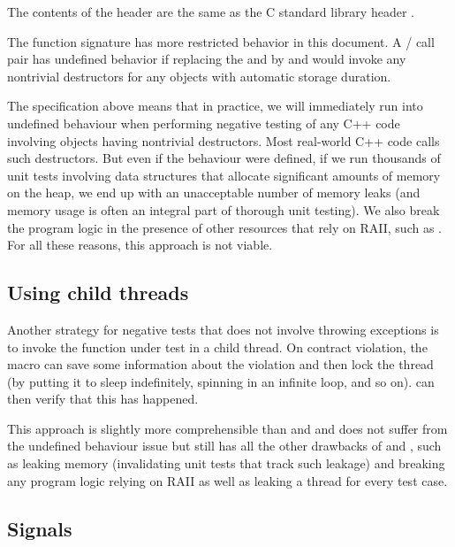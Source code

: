 \begin{adjustwidth}{0.5cm}{0.5cm}
The contents of the header  are the same as the C standard library header .

The function signature  has more restricted behavior in this document. A / call pair has undefined behavior if replacing the  and  by  and  would invoke any nontrivial destructors for any objects with automatic storage duration.
\end{adjustwidth}

The specification above means that in practice, we will immediately run into undefined behaviour when performing negative testing of any C++ code involving objects having nontrivial destructors. Most real-world C++ code calls such destructors. But even if the behaviour were defined, if we run thousands of unit tests involving data structures that allocate significant amounts of memory on the heap, we end up with an unacceptable number of memory leaks (and memory usage is often an integral part of thorough unit testing). We also break the program logic in the presence of other resources that rely on RAII, such as . For all these reasons, this approach is not viable.

\subsection{Using child threads}

Another strategy for negative tests that does not involve throwing exceptions is to invoke the function under test in a child thread. On contract violation, the  macro can save some information about the violation and then lock the thread (by putting it to sleep indefinitely, spinning in an infinite loop, and so on).  can then verify that this has happened.

This approach is slightly more comprehensible than  and  and does not suffer from the undefined behaviour issue but still has all the other drawbacks of  and , such as leaking memory (invalidating unit tests that track such leakage) and breaking any program logic relying on RAII as well as leaking a thread for every test case.


\subsection{Signals}

